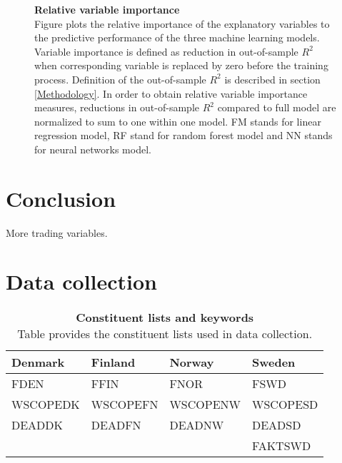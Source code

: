 \documentclass{article}
\begin{document}
\begin{figure}[ht]
\centering
\caption[Relative variable importance]{\textbf{Relative variable importance}\\ Figure plots the relative importance of the explanatory variables to the predictive performance of the three machine learning models. Variable importance is defined as reduction in out-of-sample $R^2$ when corresponding variable is replaced by zero before the training process. Definition of the out-of-sample $R^2$ is described in section \ref{Methodology}. In order to obtain relative variable importance measures, reductions in out-of-sample $R^2$ compared to full model are normalized to sum to one within one model. FM stands for linear regression model, RF stand for random forest model and NN stands for neural networks model.}

\label{plot:relative_VI}
\end{figure}

\section{Conclusion}\label{Conclusion}
More trading variables.

\clearpage

\appendix
\section{Data collection}
\renewcommand{\thefigure}{A.\arabic{figure}}
\setcounter{figure}{0}
\renewcommand{\thetable}{A.\arabic{table}}
\setcounter{table}{0}

\begin{table}[ht] 
\small
\caption[Constituent lists and keywords]{\textbf{Constituent lists and keywords}\\ Table provides the constituent lists used in data collection.}
 \label{table:constituteLists}
\centering
\begin{tabularx}{\textwidth}{X X X X}
\toprule
Denmark & Finland & Norway & Sweden \\
\midrule
FDEN 		&  FFIN		& FNOR		& FSWD\\
WSCOPEDK & WSCOPEFN & WSCOPENW& WSCOPESD\\
DEADDK 	&   DEADFN 	& DEADNW 	& DEADSD\\
& & & FAKTSWD\\
 \bottomrule
 \end{tabularx}
 \end{table} 
 
\end{document}
